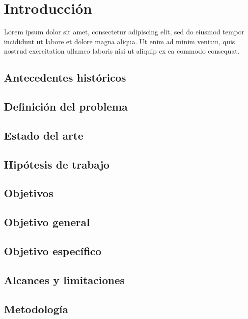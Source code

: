 \chapter{Introducción}

Lorem ipsum dolor sit amet, consectetur adipiscing elit, sed do eiusmod tempor incididunt ut labore et dolore magna aliqua. Ut enim ad minim veniam, quis nostrud exercitation ullamco laboris nisi ut aliquip ex ea commodo consequat.


\section{Antecedentes históricos}

\section{Definición del problema}

\section{Estado del arte}
\section{Hipótesis de trabajo}
\section{Objetivos}
\section{Objetivo general}
\section{Objetivo específico}
\section{Alcances y limitaciones}
\section{Metodología}